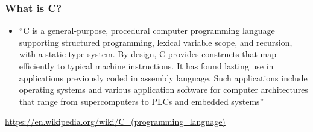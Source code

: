 \documentclass[english,14pt]{beamer}
\begin{document}

\begin{frame}[fragile]

\frametitle{What is C?}

\begin{itemize}
	\item ``C is a general-purpose, procedural computer programming language supporting structured programming, lexical variable scope, and recursion, with a static type system. By design, C provides constructs that map efficiently to typical machine instructions. It has found lasting use in applications previously coded in assembly language. Such applications include operating systems and various application software for computer architectures that range from supercomputers to PLCs and embedded systems''
\end{itemize}

\href{https://en.wikipedia.org/wiki/C_(programming_language)}{https://en.wikipedia.org/wiki/C\_(programming\_language)}




\end{frame}
\end{document}
